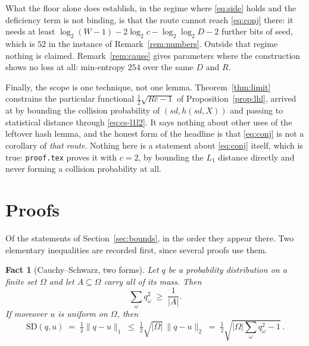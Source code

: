 \documentclass{aicr-solution}
\newcommand{\sd}{\mathit{sd}}
\newcommand{\SD}{\mathrm{SD}}
\newtheorem{fact}{Fact}
\begin{document}
What the floor alone does establish, in the regime where \eqref{eq:side} holds and the deficiency
term is not binding, is that the route cannot reach \eqref{eq:conj} there: it needs at least
$\log_2(W-1) - 2\log_2 c - \log_2\log_2 D - 2$ further bits of seed, which is $52$ in the instance
of Remark~\ref{rem:numbers}. Outside that regime nothing is claimed. Remark~\ref{rem:cause} gives
parameters where the construction shows no loss at all: min-entropy $254$ over the same $D$ and
$R$.

Finally, the scope is one technique, not one lemma. Theorem~\ref{thm:limit} constrains the
particular functional $\tfrac12\sqrt{R\bar c - 1}$ of Proposition~\ref{prop:lhl}, arrived at by
bounding the collision probability of $(\sd, h(\sd,X))$ and passing to statistical distance through
\eqref{eq:cs-l1l2}. It says nothing about other uses of the leftover hash lemma, and the honest form
of the headline is that \eqref{eq:conj} is not a corollary of \emph{that route}. Nothing here is a
statement about \eqref{eq:conj} itself, which is true: \texttt{proof.tex} proves it with $c = 2$, by
bounding the $L_1$ distance directly and never forming a collision probability at all.



\appendix

\section{Proofs}\label{sec:proofs}

Of the statements of Section~\ref{sec:bounds}, in the order they appear there. Two elementary
inequalities are recorded first, since several proofs use them.

\begin{fact}[Cauchy--Schwarz, two forms]\label{fact:cs}
Let $q$ be a probability distribution on a finite set $\Omega$ and let $A \subseteq \Omega$ carry
all of its mass. Then
\begin{equation}\label{eq:cs-collide}
  \sum_{\omega} q_\omega^2 \;\ge\; \frac{1}{|A|} .
\end{equation}
If moreover $u$ is uniform on $\Omega$, then
\begin{equation}\label{eq:cs-l1l2}
  \SD(q,u) \;=\; \tfrac12 \|q - u\|_1 \;\le\; \tfrac12\sqrt{|\Omega|}\,\|q-u\|_2
  \;=\; \tfrac12\sqrt{|\Omega|\textstyle\sum_\omega q_\omega^2 - 1} \, .
\end{equation}
\end{fact}
\end{document}
